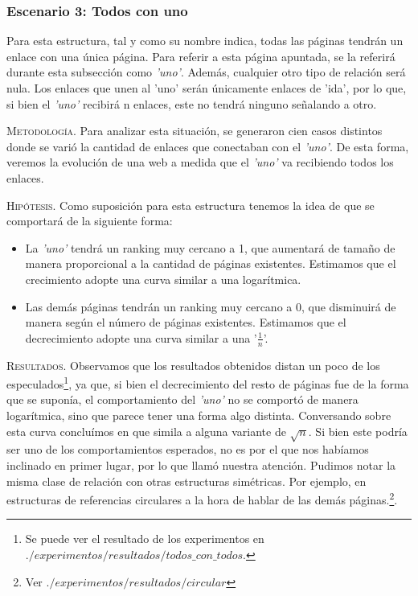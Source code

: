 \subsubsection{Escenario 3: Todos con uno} Para esta estructura, tal y como su nombre indica, todas las páginas tendrán un enlace con una única página. Para referir a esta página apuntada, se la referirá durante esta subsección como \textit{'uno'}. Además, cualquier otro tipo de relación será nula. Los enlaces que unen al 'uno' serán únicamente enlaces de 'ida', por lo que, si bien el \textit{'uno'} recibirá n enlaces, este no tendrá ninguno señalando a otro.

\vspace{1em}

\vspace{1em}
\noindent \textsc{Metodología}. Para analizar esta situación, se generaron cien casos distintos donde se varió la cantidad de enlaces que conectaban con el \textit{'uno'}. De esta forma, veremos la evolución de una web a medida que el \textit{'uno'} va recibiendo todos los enlaces.

\vspace{1em}
\noindent \textsc{Hipótesis}. Como suposición para esta estructura tenemos la idea de que se comportará de la siguiente forma:
\begin{itemize}
\item La \textit{'uno'} tendrá un ranking muy cercano a 1, que aumentará de tamaño de manera proporcional a la cantidad de páginas existentes. Estimamos que el crecimiento adopte una curva similar a una logarítmica.
\item Las demás páginas tendrán un ranking muy cercano a 0, que disminuirá de manera según el número de páginas existentes. Estimamos que el decrecimiento adopte una curva similar a una '\(\frac{1}{n}\)'.
\end{itemize}

\vspace{1em}
\noindent \textsc{Resultados}. Observamos que los resultados obtenidos distan un poco de los especulados\footnote{Se puede ver el resultado de los experimentos en $./experimentos/resultados/todos\_con\_todos$.}, ya que, si bien el decrecimiento del resto de páginas fue de la forma que se suponía, el comportamiento del \textit{'uno'} no se comportó de manera logarítmica, sino que parece tener una forma algo distinta. Conversando sobre esta curva concluímos en que simila a alguna variante de $\sqrt{n}$.
Si bien este podría ser uno de los comportamientos esperados, no es por el que nos habíamos inclinado en primer lugar, por lo que llamó nuestra atención.
\vspace{1em}
\noindent Pudimos notar la misma clase de relación con otras estructuras simétricas. Por ejemplo, en estructuras de referencias circulares a la hora de hablar de las demás páginas.\footnote{Ver $./experimentos/resultados/circular$}.

